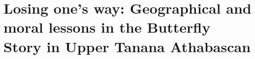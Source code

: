 
%
%
%




\chapter[Losing one's way]{\vspace{-25pt}Losing one's way: Geographical and moral lessons in the Butterfly Story in Upper Tanana Athabascan}


